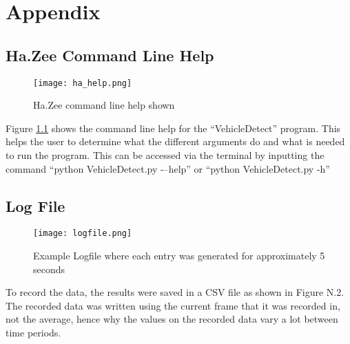 %
%
%                 

\chapter{Appendix}
\label{sec:appendixa}

\section{Ha.Zee Command Line Help}

\begin{figure}[h!]
	\texttt{[image: ha\_help.png]}
	\caption{Ha.Zee command line help shown}
	\label{fig:cmd_help}
\end{figure}

Figure \ref{fig:cmd_help} shows the command line help for the “VehicleDetect” program. This helps the user to determine what the different arguments do and what is needed to run the program. This can be accessed via the terminal by inputting the command “python VehicleDetect.py -–help” or “python VehicleDetect.py -h”

\section{Log File}

\begin{figure}[h!]
	\texttt{[image: logfile.png]}
	\caption{Example Logfile where each entry was generated for approximately 5 seconds}
	\label{fig:logfile}
\end{figure}

To record the data, the results were saved in a CSV file as shown in Figure N.2. The recorded data was written using the current frame that it was recorded in, not the average, hence why the values on the recorded data vary a lot between time periods. 



%

